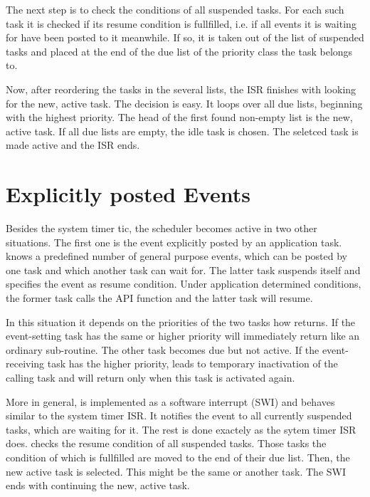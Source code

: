 The next step is to check the conditions of all suspended tasks. For each
such task it is checked if its resume condition is fullfilled, i.e. if all
events it is waiting for have been posted to it meanwhile. If so, it is
taken out of the list of suspended tasks and placed at the end of the due
list of the priority class the task belongs to.

Now, after reordering the tasks in the several lists, the ISR finishes
with looking for the new, active task. The decision is easy. It loops
over all due lists, beginning with the highest priority. The head of the
first found non-empty list is the new, active task. If all due lists are
empty, the idle task is chosen. The seletced task is made active and the
ISR ends.


\section{Explicitly posted Events}
\label{secManualEvents}

Besides the system timer tic, the scheduler becomes active in two other
situations. The first one is the event explicitly posted by an application
task. \rtos{} knows a predefined number of general purpose events, which
can be posted by one task and which another task can wait for. The latter
task suspends itself and specifies the event as resume condition. Under
application determined conditions, the
former task calls the \rtos{} API function  and the latter
task will resume. 

In this situation it depends on the priorities of the two tasks how
 returns. If the event-setting task has the same or higher
priority  will immediately return like an ordinary
sub-routine. The other task becomes due but not active. If the
event-receiving task has the higher priority,  leads to
temporary inactivation of the calling task and will return only when this
task is activated again.

More in general,  is implemented as a software interrupt
(SWI) and behaves similar to the system timer ISR. It notifies the event
to all currently suspended tasks, which are waiting for it. The rest is
done exactely as the sytem timer ISR does.  checks the
resume condition of all suspended tasks. Those tasks the condition of
which is fullfilled are moved to the end of their due list. Then, the new
active task is selected. This might be the same or another task. The SWI
ends with continuing the new, active task.


